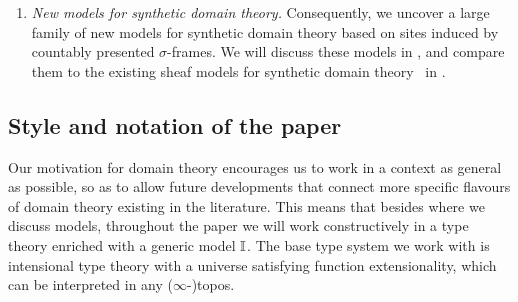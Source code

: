 \begin{enumerate}[leftmargin=*]
\begin{enumerate}
    \item {} introduces various local conditions for $\I$, all of which will be compatible with quasi-coherence. This showcases the flexibility of this framework to encompass different flavours of domain theory.

    \item  More interestingly, without assuming the local properties globally, one can still show that $\I$ will be \emph{right orthogonal} to the maps that classifies these local properties (). In general, any limiting diagram of spatial algebras will induce a localisation class containing $\I$; cf.\ . This exhibits a new type of techniques in reasoning about domains in this framework.
    
    \item As a special case of locality, we also connect to the recent approach of synthetic (higher) category theory~\citep{riehl2017type,buchholtz2021synthetic,gratzer2024directed}. In particular, we show spectra will be synthetic categories (). As another example, we also show $\omega$ is a synthetic category, in fact it satisfies \emph{all} the orthogonality conditions discussed in this paper except chain completeness ().
  \end{enumerate}

  \item \emph{New models for synthetic domain theory.} Consequently, we uncover a large family of new models for synthetic domain theory based on sites induced by countably presented $\sigma$-frames. We will discuss these models in , and compare them to the existing sheaf models for synthetic domain theory~\citep{FIORE1997151} in .
\end{enumerate}


\subsection{Style and notation of the paper}

Our motivation for domain theory encourages us to work in a context as general as possible, so as to allow future developments that connect more specific flavours of domain theory existing in the literature. This means that besides  where we discuss models, throughout the paper we will work constructively in a type theory enriched with a generic model $\I$. The base type system we work with is intensional type theory with a universe satisfying function extensionality, which can be interpreted in any ($\infty$-)topos. 

